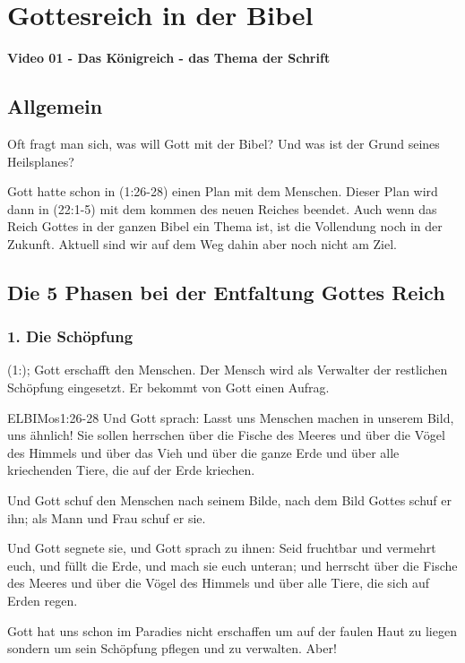 \documentclass{mybib}
\author{OTS}
\begin{document}
    \tableofcontents
    \section{Gottesreich in der Bibel}
    \textbf{Video 01 - Das Königreich - das Thema der Schrift}
    \subsection{Allgemein}
    Oft fragt man sich, was will Gott mit der Bibel? Und was ist der Grund seines Heilsplanes?

    Gott hatte schon in (1:26-28) einen Plan mit dem Menschen. Dieser Plan wird dann in (22:1-5) mit dem kommen des neuen Reiches beendet. Auch wenn das Reich Gottes in der ganzen Bibel ein Thema ist, ist die Vollendung noch in der Zukunft. Aktuell sind wir auf dem Weg dahin aber noch nicht am Ziel.
    \subsection{Die 5 Phasen bei der Entfaltung Gottes Reich}
    \subsubsection*{1. Die Schöpfung}
    (1:); Gott erschafft den Menschen. Der Mensch wird als Verwalter der restlichen Schöpfung eingesetzt. Er bekommt von Gott einen Aufrag.
    \begin{bibelbox}{ELB}{IMos}{1:26-28}
        Und Gott sprach: \flqq Lasst uns Menschen machen in unserem Bild, uns ähnlich! Sie sollen herrschen über die Fische des Meeres und über die Vögel des Himmels und über das Vieh und über die ganze Erde und über alle kriechenden Tiere, die auf der Erde kriechen.\frqq{}

        Und Gott schuf den Menschen nach seinem Bilde, nach dem Bild Gottes schuf er ihn; als Mann und Frau schuf er sie. 
        
        Und Gott segnete sie, und Gott sprach zu ihnen: \flqq Seid fruchtbar und vermehrt euch, und füllt die Erde, und mach sie euch unteran; und herrscht über die Fische des Meeres und über die Vögel des Himmels und über alle Tiere, die sich auf Erden regen.\frqq{}
    \end{bibelbox}
    Gott hat uns schon im Paradies nicht erschaffen um auf der faulen Haut zu liegen sondern um sein Schöpfung pflegen und zu verwalten. Aber!
\end{document}
